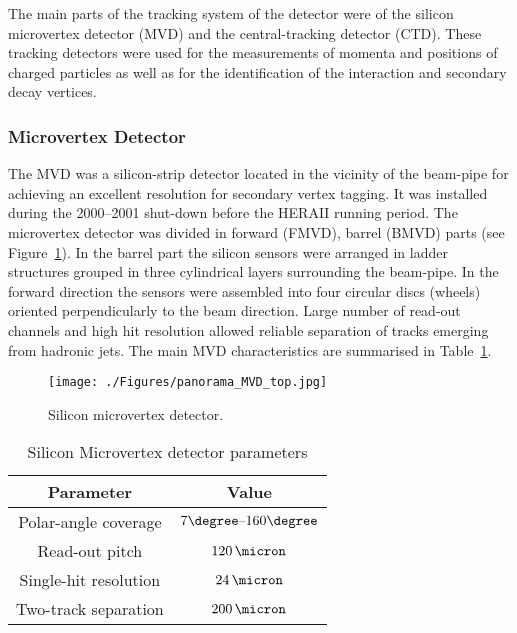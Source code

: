 The main parts of the tracking system of the \zeus detector were of the silicon microvertex detector (MVD) and the central-tracking detector (CTD). These tracking detectors were used for the measurements of momenta and positions of charged particles as well as for the identification of the interaction and secondary decay vertices.

\subsubsection{Microvertex Detector}
\label{subsubsec:mvd}
The MVD was a silicon-strip detector located in the vicinity of the beam-pipe for achieving an excellent resolution for secondary vertex tagging. It was installed during the 2000--2001 shut-down before the HERAII running period. The microvertex detector was divided in forward (FMVD), barrel (BMVD) parts (see Figure~\ref{fig:MVD_artistic}). In the barrel part the silicon sensors were arranged in ladder structures grouped in three cylindrical layers surrounding the beam-pipe. In the forward direction the sensors were assembled into four circular discs (wheels) oriented perpendicularly to the beam direction. Large number of read-out channels and high hit resolution allowed reliable separation of tracks emerging from hadronic jets. The main MVD characteristics are summarised in Table~\ref{tab:mvdgeomparameters}. 

\begin{figure}[htbp]
	\centering
		\texttt{[image: ./Figures/panorama\_MVD\_top.jpg]}
	\caption{Silicon microvertex detector.}
	\label{fig:MVD_artistic}
\end{figure}

\begin{table}[htbp]
	\centering
\begin{tabular}{ | c | c | }
     \hline
      Parameter & Value \\
			\hline
			\hline
			Polar-angle coverage & $7\degree \mbox{--} 160\degree$ \\ \hline
      Read-out pitch & $120\,\micron$  \\ \hline
			Single-hit resolution & $24\,\micron$ \\ \hline 
			Two-track separation & $200\,\micron$ \\
      \hline
     \end{tabular}
	\caption{Silicon Microvertex detector parameters}
	\label{tab:mvdgeomparameters}
\end{table}

